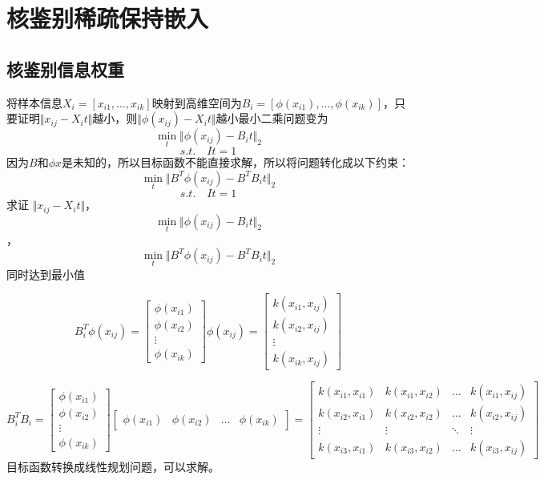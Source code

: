 \section{核鉴别稀疏保持嵌入}
\subsection{核鉴别信息权重}
将样本信息$X_{i}=[x_{i1},\ldots,x_{ik}]$映射到高维空间为$B_{i}=[\phi(x_{i1}),\ldots,\phi(x_{ik})]$，只要证明$\Vert x_{ij}-X_{i}t\Vert$越小，则$\Vert \phi(x_{ij})-X_{i}t\Vert$越小最小二乘问题变为
$$\min_{t}\Vert{\phi{(x_{ij})}-B_{i}t}\Vert_{2}$$
$$s.t.\quad It=1$$
因为$B$和$\phi{x}$是未知的，所以目标函数不能直接求解，所以将问题转化成以下约束：
$$\min_{t}\Vert{B^{T}\phi{(x_{ij})}-B^{T}B_{i}t}\Vert_{2}$$
$$s.t.\quad It=1$$
求证 $\Vert x_{ij}-X_{i}t\Vert$，$$\min_{t}\Vert{\phi{(x_{ij})}-B_{i}t}\Vert_{2}$$，$$\min_{t}\Vert{B^{T}\phi{(x_{ij})}-B^{T}B_{i}t}\Vert_{2}$$同时达到最小值

\begin{displaymath}
	B_{i}^{T}\phi{(x_{ij})}=
		\left[
			\begin{array}{ccc}
				\phi{(x_{i1})}\\
				\phi{(x_{i2})}\\
				\vdots\\
				\phi{(x_{ik})}
			\end{array}
		\right]\phi{(x_{ij})}=
		\left[
			\begin{array}{ccc}
				k(x_{i1},x_{ij})\\
				k(x_{i2},x_{ij})\\
				\vdots\\
				k(x_{ik},x_{ij})
			\end{array}
		\right]
\end{displaymath}

\begin{displaymath}
B_{i}^{T}B_{i}=
	\left[
		\begin{array}{ccc}
			\phi{(x_{i1})}\\
			\phi{(x_{i2})}\\
			\vdots\\
			\phi{(x_{ik})}
		\end{array}
	\right]
	\left[
		\begin{array}{cccc}
			\phi{(x_{i1})} & \phi{(x_{i2})} & \ldots & \phi{(x_{ik})}
		\end{array}
	\right]=
	\left[
		\begin{array}{cccc}
			k(x_{i1},x_{i1}) & k(x_{i1},x_{i2}) & \ldots & k(x_{i1},x_{ij})\\
			k(x_{i2},x_{i1}) & k(x_{i2},x_{i2}) & \ldots & k(x_{i2},x_{ij})\\
			\vdots & \vdots & \ddots & \vdots \\
			k(x_{i3},x_{i1}) & k(x_{i3},x_{i2}) & \ldots & k(x_{i3},x_{ij})
		\end{array}
	\right]
\end{displaymath}
目标函数转换成线性规划问题，可以求解。

